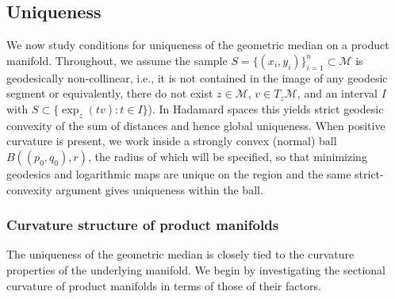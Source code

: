 \documentclass[10pt]{article}
\begin{document}
\subsection{Uniqueness}



We now study conditions for uniqueness of the geometric median on a product manifold. Throughout, we assume the sample $S=\{(x_i,y_i)\}_{i=1}^n\subset\mathcal{M}$ is geodesically non-collinear, i.e., it is not contained in the image of any geodesic segment or equivalently, there do not exist $z\in\mathcal{M}$, $v\in T_z\mathcal{M}$, and an interval $I$ with $S\subset\{\exp_z(tv):t\in I\}$). In Hadamard spaces this yields strict geodesic convexity of the sum of distances and hence global uniqueness. When positive curvature is present, we work inside a strongly convex (normal) ball $B((p_0,q_0),r)$, the radius of which will be specified, so that minimizing geodesics and logarithmic maps are unique on the region and the same strict-convexity argument gives uniqueness within the ball.





\subsubsection{Curvature structure of product manifolds}

The uniqueness of the geometric median is closely tied to the curvature properties of the underlying manifold. We begin by investigating the sectional curvature of product manifolds in terms of those of their factors.
\end{document}
